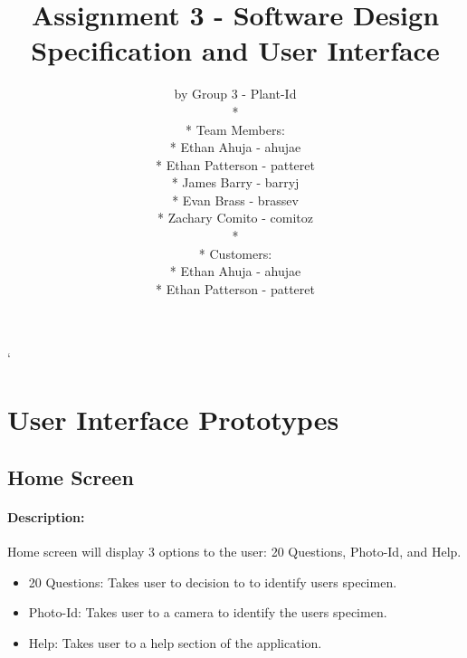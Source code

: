 \documentclass[a4paper]{article}
\title{Assignment 3 - Software Design Specification and User Interface}
\author{ by Group 3 - Plant-Id \\* \\* Team Members: \\* Ethan Ahuja - ahujae \\* Ethan Patterson - patteret \\* James Barry - barryj \\* Evan Brass - brassev \\* Zachary Comito - comitoz \\* \\* Customers: \\* Ethan Ahuja - ahujae \\* Ethan Patterson - patteret }
\begin{document}
\maketitle
\pagebreak
`\tableofcontents
\pagebreak
\section{User Interface Prototypes}
\subsection{Home Screen}
\paragraph{Description:}Home screen will display 3 options to the user: 20 Questions, Photo-Id, and Help.
\begin{itemize}
\item 20 Questions: Takes user to decision to to identify users specimen.
\item Photo-Id: Takes user to a camera to identify the users specimen.
\item Help: Takes user to a help section of the application. 
\end{itemize}
\end{document}
